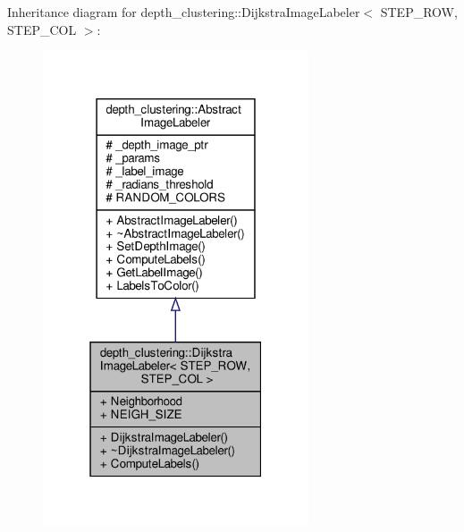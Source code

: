 Inheritance diagram for depth\+\_\+clustering\+:\+:Dijkstra\+Image\+Labeler$<$ S\+T\+E\+P\+\_\+\+R\+OW, S\+T\+E\+P\+\_\+\+C\+OL $>$\+:\nopagebreak
\begin{figure}[H]
\begin{center}
\leavevmode
\includegraphics[width=223pt]{classdepth__clustering_1_1DijkstraImageLabeler__inherit__graph}
\end{center}
\end{figure}


